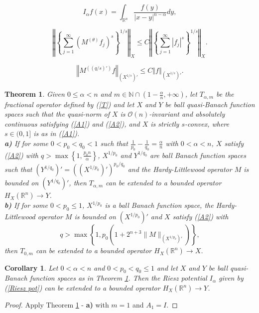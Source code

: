 \documentclass[10pt,a4paper]{amsart}
\newtheorem{theorem}{Theorem}
\newtheorem{corollary}{Corollary}
\begin{document}
\begin{equation} \label{Riesz pot}
I_{\alpha}f(x) = \int_{\mathbb{R}^{n}} \frac{f(y)}{|x-y|^{n- \alpha}} dy, 
\end{equation}

\begin{equation} \label{A1}
\left\Vert  \left\{ \sum_{j=1}^{\infty} (M^{(\theta)} f_j)^{s} \right\}^{1/s} \right\Vert_{X} \leq C
\left\Vert \left\{ \sum_{j=1}^{\infty} |f_j|^{s} \right\}^{1/s}  \right\Vert_{X}.
\end{equation}

\begin{equation} \label{A2}
\left\Vert  M^{((q/s)')} f \right\Vert_{(X^{1/s})'} \leq C \left\Vert f  \right\Vert_{(X^{1/s})'}.
\end{equation}

\begin{theorem} \label{main thm}
Given $0 \leq \alpha < n$ and $m \in \mathbb{N} \cap \left(1 - \frac{\alpha}{n}, +\infty \right)$, let $T_{\alpha, m}$ be the fractional operator defined by (\ref{T}) and let $X$ and $Y$ be ball quasi-Banach function spaces such that the quasi-norm of $X$ is $\mathcal{O}(n)$-invariant and absolutely continuous satisfying (\ref{A1}) and (\ref{A2}), and $X$ is strictly $s$-convex, where $s \in (0,1]$ is as in 
(\ref{A1}). 
\\
\textbf{a)} If for some $0 < p_0 < q_0 < 1$ such that $\frac{1}{p_0} - \frac{1}{q_0} = \frac{\alpha}{n}$ with $0 < \alpha < n$, $X$ 
satisfy (\ref{A2}) with $q > \max \left\{1, \frac{p_0 n}{\alpha} \right\}$, $X^{1/p_0}$ and $Y^{1/q_0}$ are ball Banach function spaces such that $(Y^{1/q_0})' = ((X^{1/p_0})')^{p_0/q_0}$ and the Hardy-Littlewood operator $M$ is bounded on $(Y^{1/q_0})'$,
then $T_{\alpha, m}$ can be extended to a bounded operator $H_X(\mathbb{R}^n) \to Y$.
\\
\textbf{b)} If for some $0 < p_0 \leq 1$, $X^{1/p_0}$ is a ball Banach function space, the Hardy-Littlewood operator $M$ is bounded on 
$(X^{1/p_0})'$ and $X$ satisfy (\ref{A2}) with 
\begin{equation} \label{qb}
q > \max \left\{1, p_0 \left(1+2^{n+3} \| M \|_{(X^{1/p_0})'} \right) \right\},
\end{equation}
then $T_{0, m}$ can be extended to a bounded operator $H_X(\mathbb{R}^n) \to X$.
\end{theorem}

\begin{corollary} \label{estim riesz}
Let $0 < \alpha < n$ and $0 < p_0 < q_0 \leq 1$ and let $X$ and $Y$ be ball quasi-Banach function spaces as in Theorem \ref{main thm}. Then the Riesz potential $I_{\alpha}$ given by (\ref{Riesz pot}) can be extended to a bounded operator $H_X(\mathbb{R}^n) \to Y$.
\end{corollary}

\begin{proof}
Apply Theorem \ref{main thm} - \textbf{a)} with $m=1$ and $A_1 = I$.
\end{proof}
\end{document}
